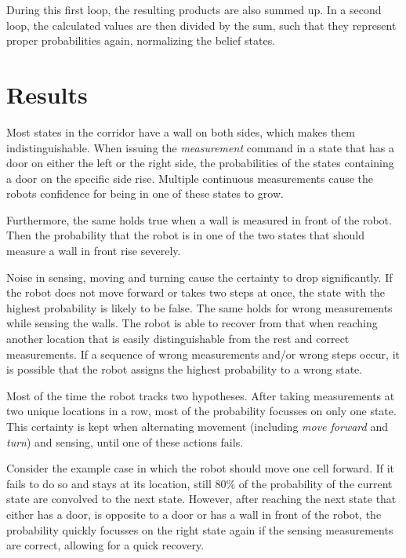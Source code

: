 \documentclass[10pt,a4paper]{article}
\begin{document}
		During this first loop, the resulting products are also summed up. In a second loop, the calculated values are then divided by the sum, such that they represent proper probabilities again, normalizing the belief states.
	
	\section{Results}	
	Most states in the corridor have a wall on both sides, which makes them indistinguishable. When issuing the \textit{measurement} command in a state that has a door on either the left or the right side, the probabilities of the states containing a door on the specific side rise. Multiple continuous measurements cause the robots confidence for being in one of these states to grow.
	
	Furthermore, the same holds true when a wall is measured in front of the robot. Then the probability that the robot is in one of the two states that should measure a wall in front rise severely.
	
	Noise in sensing, moving and turning cause the certainty to drop significantly. If the robot does not move forward or takes two steps at once, the state with the highest probability is likely to be false. The same holds for wrong measurements while sensing the walls. The robot is able to recover from that when reaching another location that is easily distinguishable from the rest and correct measurements. If a sequence of wrong measurements and/or wrong steps occur, it is possible that the robot assigns the highest probability to a wrong state. 
	
	Most of the time the robot tracks two hypotheses. After taking measurements at two unique locations in a row, most of the probability focusses on only one state. This certainty is kept when alternating movement (including \textit{move forward} and \textit{turn}) and sensing, until one of these actions fails.
	
	Consider the example case in which the robot should move one cell forward. If it fails to do so and stays at its location, still $80\%$ of the probability of the current state are convolved to the next state. However, after reaching the next state that either has a door, is opposite to a door or has a wall in front of the robot, the probability quickly focusses on the right state again if the sensing measurements are correct, allowing for a quick recovery.
	
\end{document}
